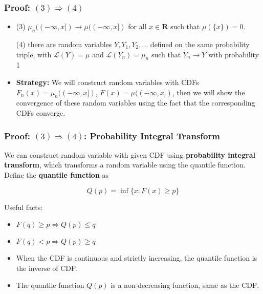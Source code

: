 \documentclass[handout]{beamer}
\begin{document}
\frame
{
  \frametitle{Proof: $(3) \Rightarrow (4)$ } 

   \begin{itemize}

\item<1-> (3) $\mu_n((-\infty, x])\rightarrow \mu((-\infty, x])$ for all $x\in \mathbf{R}$ such that $\mu(\{x\})=0$.
                                            \vspace{2mm}

              {\color{blue}  (4) there are random variables $Y, Y_1, Y_2, \ldots$ defined on the same probability triple, with $\mathcal{L} (Y)=\mu$ and $\mathcal{L} (Y_n)=\mu_n $ such that $Y_n\rightarrow Y$ with probability 1 }
                                                           \vspace{2mm}

               
\item<2-> \textbf{Strategy:}  We will construct random variables with CDFs $F_n(x)=\mu_n((-\infty, x])$, $F(x)=\mu((-\infty, x])$, then we will show the convergence of these random variables using the fact that the corresponding CDFs converge.
                     
\end{itemize}
}

\frame
{
  \frametitle{Proof: $(3) \Rightarrow (4)$:  Probability Integral Transform} 

We can construct random variable with given CDF using \textbf{probability integral transform}, which transforms a random variable using the quantile function. \\

Define the \textbf{quantile function} as

$$
Q(p)=\inf \{x: F(x) \geq p\}
$$

Useful facts:

\begin{itemize}

\item<1->[-] $F(q)\geq p \iff Q(p)\leq q $
                
                                          
\item<2->[-] $F(q)< p \Rightarrow Q(p)\ge q$

                       
\item<3->[-]When the CDF is continuous and strictly increasing, the quantile function is the inverse of CDF.  
                       
                       
\item<4->[-] The quantile function $Q(p)$ is a non-decreasing function, same as the CDF.

\end{itemize}

}
\end{document}
